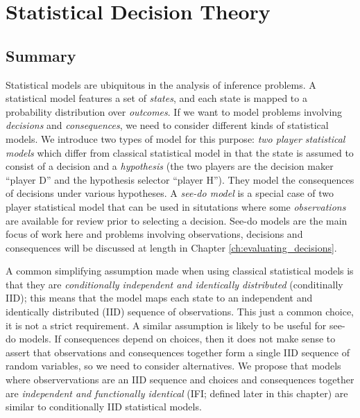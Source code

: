 
\chapter{Statistical Decision Theory}\label{ch:sdt}

\section{Summary}

Statistical models are ubiquitous in the analysis of inference problems. A statistical model features a set of \emph{states}, and each state is mapped to a probability distribution over \emph{outcomes}. If we want to model problems involving \emph{decisions} and \emph{consequences}, we need to consider different kinds of statistical models. We introduce two types of model for this purpose: \emph{two player statistical models} which differ from classical statistical model in that the state is assumed to consist of a decision and a \emph{hypothesis} (the two players are the decision maker ``player D'' and the hypothesis selector ``player H''). They model the consequences of decisions under various hypotheses. A \emph{see-do model} is a special case of two player statistical model that can be used in situtations where some \emph{observations} are available for review prior to selecting a decision. See-do models are the main focus of work here and problems involving observations, decisions and consequences will be discussed at length in Chapter \ref{ch:evaluating_decisions}.

A common simplifying assumption made when using classical statistical models is that they are \emph{conditionally independent and identically distributed} (conditinally IID); this means that the model maps each state to an independent and identically distributed (IID) sequence of observations. This just a common choice, it is not a strict requirement. A similar assumption is likely to be useful for see-do models. If consequences depend on choices, then it does not make sense to assert that observations and consequences together form a single IID sequence of random variables, so we need to consider alternatives. We propose that models where observervations are an IID sequence and choices and consequences together are \emph{independent and functionally identical} (IFI; defined later in this chapter) are similar to conditionally IID statistical models. 


